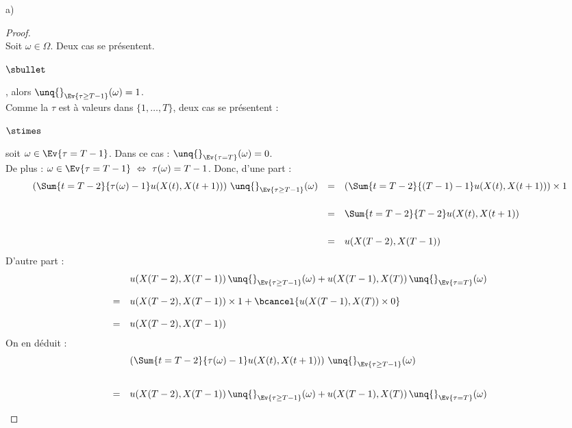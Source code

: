 \documentclass[11pt]{article}%
\begin{document}
\begin{noliste}{a)}
    \begin{proof}~\\
      Soit $\omega \in \Omega$. Deux cas se présentent.
      \begin{noliste}{$\sbullet$}
        \item {}, alors
        $\unq{}_{\Ev{\tau \geq T-1}}(\omega)=1$.\\[.1cm]
        Comme la \var $\tau$ est à valeurs dans $\{1, \ldots , T\}$, 
        deux cas se présentent :
        \begin{noliste}{$\stimes$}
	  \item soit $\omega \in \Ev{\tau = T-1}$. Dans ce cas : 
	  $\unq{}_{\Ev{\tau = T}}(\omega)=0$.\\
	  De plus : $\omega \in \Ev{\tau = T-1} \ \Leftrightarrow \
	  \tau(\omega) = T-1$. Donc, d'une part :
	  \[
	    \begin{array}{rcl}
	      \left(\Sum{t=T-2}{\tau(\omega)-1} u(X(t),X(t+1))\right)
	      \, \unq{}_{\Ev{\tau \geq T-1}}(\omega) 
	      &=&
	      \left(\Sum{t=T-2}{(T-1)-1} u(X(t),X(t+1))\right)
	      \times 1
	      \\[.6cm]
	      &=& \Sum{t=T-2}{T-2} u(X(t),X(t+1))
	      \\[.6cm]
	      &=& u(X(T-2),X(T-1))
	    \end{array}
	  \]
	  D'autre part :
	  \[
	    \begin{array}{cl}
	      & u(X(T-2),X(T-1)) \, \unq{}_{\Ev{\tau \geq T-1}}
	      (\omega) + u(X(T-1),X(T)) \, \unq{}_{\Ev{\tau =T}}
	      (\omega)
	      \\[.4cm]
	      =& u(X(T-2),X(T-1)) \times 1 + \bcancel{u(X(T-1),X(T))
	      \times 0}
	      \\[.4cm]
	      =& u(X(T-2),X(T-1))
	    \end{array}
	  \]
	  On en déduit :
	  \[
	    \begin{array}{cl}
	      & \left( \Sum{t=T-2}{\tau(\omega)-1} 
	      u(X(t),X(t+1))\right)   \,
	      \unq{}_{\Ev{\tau \geq T-1}}(\omega)
	      \\[.8cm]
	      =& u(X(T-2),X(T-1)) \, \unq{}_{\Ev{\tau \geq T-1}}(\omega)
	      + u(X(T-1),X(T)) \, \unq{}_{\Ev{\tau =T}}(\omega)
	    \end{array}
	  \]
	  

\end{noliste}
\end{noliste}
\end{proof}
\end{noliste}
\end{document}
